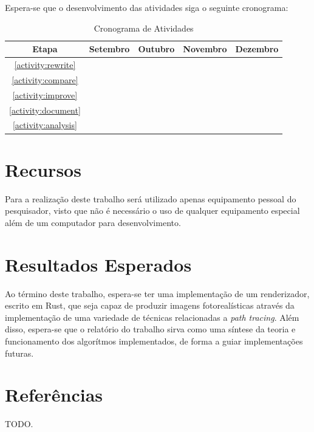 \documentclass[12pt]{article}
\newcommand{\todo}[1]{\textsf{\color{red}#1}}
\begin{document}
Espera-se que o desenvolvimento das atividades siga o seguinte cronograma:

\begin{table}[h]
\centering
\begin{tabular}{c|cccc}
	Etapa & Setembro & Outubro & Novembro & Dezembro \\ \hline
	\ref{activity:rewrite} & \checkmark & & & \\
	\ref{activity:compare} & \checkmark & & & \\
	\ref{activity:improve} & & \checkmark & \checkmark & \\
	\ref{activity:document} & \checkmark & \checkmark & \checkmark & \checkmark \\
	\ref{activity:analysis} & & & & \checkmark \\
\end{tabular}
\caption{Cronograma de Atividades}
\end{table}

\section{Recursos}

Para a realização deste trabalho será utilizado apenas equipamento pessoal do pesquisador, visto que
não é necessário o uso de qualquer equipamento especial além de um computador para desenvolvimento.

\section{Resultados Esperados}

Ao término deste trabalho, espera-se ter uma implementação de um renderizador, escrito em Rust, que
seja capaz de produzir imagens fotorealísticas através da implementação de uma variedade de técnicas
relacionadas a \emph{path tracing}. Além disso, espera-se que o relatório do trabalho sirva como uma
síntese da teoria e funcionamento dos algorítmos implementados, de forma a guiar implementações
futuras.

\section{Referências}

\todo{TODO.}
\end{document}
